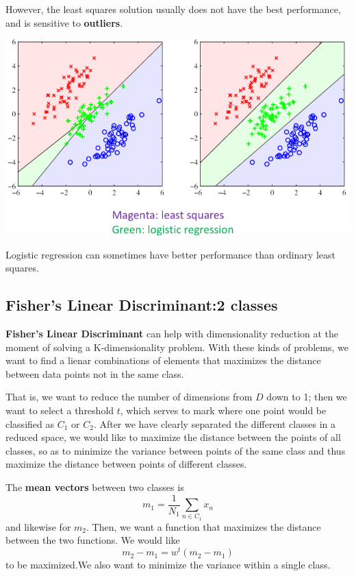 \documentclass{tufte-handout}
\begin{document}
	However, the least squares solution usually does not have the best performance, and is 
	sensitive to \textbf{outliers}.
	\begin{marginfigure}
			\includegraphics[width=\linewidth]{ls_not_good}
			\caption{Logistic regression can sometimes have better performance than
				ordinary least squares.}
	\end{marginfigure}
\subsection{Fisher's Linear Discriminant:2 classes}
	\textbf{Fisher's Linear Discriminant} can help with dimensionality reduction at the moment
	of solving a K-dimensionality problem. With these kinds of problems, we want to find a lienar
	combinations of elements that maximizes the distance between data points not in the same class.

	That is, we want to reduce the number of dimensions from $D$ down to 1; then we want to select 
	a threshold $t$, which serves to mark where one point would be classified as $C_{1}$ or $C_{2}$.
	After we have clearly separated the different classes in a reduced space, we would like to maximize
	the distance between the points of all classes, so as to minimize the variance between points of the 
	same class and thus maximize the distance between points of different classes.

	The \textbf{mean vectors} between two classes is 
	\[ m_{1} = \frac{1}{N_{1}} \sum_{n\in C_{1}}^{}x_{n}\]
	and likewise for $m_{2}$. Then, we want a function that maximizes the distance between the two
	functions. We would like  
	\[ m_{2} - m_{1} = w^{t}(m_{2} - m_{1})\]
	to be maximized.We also want to minimize the variance within a single class.
\end{document}
